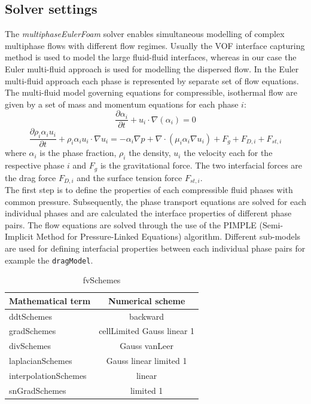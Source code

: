 \documentclass[11pt,a4paper]{article}
\begin{document}
\subsection{Solver settings}
\label{sub:solver}
The \textit{multiphaseEulerFoam} solver enables simultaneous modelling of complex multiphase flows with different flow regimes. Usually the VOF interface capturing method is used to model the large fluid-fluid interfaces, whereas in our case the Euler multi-fluid approach is used for modelling the dispersed flow. In the Euler multi-fluid approach each phase is represented by separate set of flow equations. 
The multi-fluid model governing equations for compressible, isothermal flow are given by a set of mass and momentum equations for each phase $i$:
\begin{equation}
    \frac{\partial \alpha_i}{\partial t}+u_i\cdot \nabla (\alpha_i)=0
\end{equation}
\begin{equation}
    \frac{\partial \rho_i\alpha_iu_i}{\partial t}+\rho_i\alpha_iu_i\cdot \nabla u_i=-\alpha_i\nabla p+\nabla \cdot (\mu_i\alpha_i\nabla u_i)+F_g+F_{D,i}+F_{st,i}
\end{equation}
where $\alpha_i$ is the phase fraction, $\rho_i$ the density, $u_i$ the velocity each for the respective phase $i$ and $F_g$ is the gravitational force. The two interfacial forces are the drag force $F_{D,i}$ and the surface tension force $F_{st,i}$. \\
The first step is to define the properties of each compressible fluid phases with common pressure. Subsequently, the phase transport equations are solved for each individual phases and are calculated the interface properties of different phase pairs. The flow equations are solved through the use of the PIMPLE (Semi-Implicit Method for Pressure-Linked Equations) algorithm. Different sub-models are used for defining interfacial properties between each individual phase pairs for example the \verb!dragModel!.
\begin{table}[H]
  \centering
    \begin{tabular}{|p{10em} c|}
    \hline
    \rowcolor{bluePoli!40}
    \textbf{Mathematical term} & \textbf{Numerical scheme}\\
     \hline \hline
    ddtSchemes & backward\\
    gradSchemes & cellLimited Gauss linear 1\\
    divSchemes & Gauss vanLeer\\
    laplacianSchemes & Gauss linear limited 1\\
    interpolationSchemes & linear\\
    snGradSchemes & limited 1\\
    \hline
    \end{tabular}%
  \caption{fvSchemes}
  \label{tab:fvSchemes}%
\end{table}%
\end{document}

